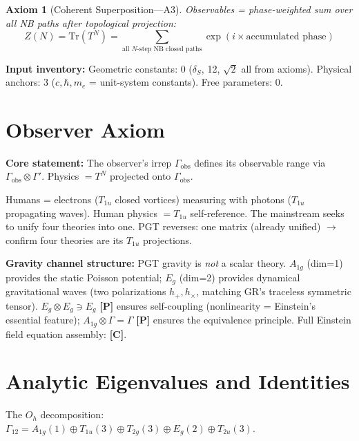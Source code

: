 \documentclass[11pt,a4paper]{article}
\newtheorem{axiom}{Axiom}
\newcommand{\gradeP}{\textbf{[P]}}
\newcommand{\gradeC}{\textbf{[C]}}
\begin{document}
\begin{axiom}[Coherent Superposition---A3]
Observables = phase-weighted sum over all NB paths after topological projection:
$$Z(N) = \mathrm{Tr}(T^N) = \sum_{\text{all $N$-step NB closed paths}} \exp(i\times\text{accumulated phase})$$
\end{axiom}

\textbf{Input inventory:} Geometric constants: 0 ($\delta_S$, 12, $\sqrt{2}$ all from axioms). Physical anchors: 3 ($c, \hbar, m_e$ = unit-system constants). Free parameters: 0.

\section{Observer Axiom}\label{sec:observer}

\textbf{Core statement:} The observer's irrep $\Gamma_{\mathrm{obs}}$ defines its observable range via $\Gamma_{\mathrm{obs}}\otimes\Gamma'$. Physics $= T^N$ projected onto $\Gamma_{\mathrm{obs}}$.

Humans = electrons ($T_{1u}$ closed vortices) measuring with photons ($T_{1u}$ propagating waves). Human physics $= T_{1u}$ self-reference. The mainstream seeks to unify four theories into one. PGT reverses: one matrix (already unified) $\to$ confirm four theories are its $T_{1u}$ projections.

\textbf{Gravity channel structure:} PGT gravity is \emph{not} a scalar theory. $A_{1g}$ (dim=1) provides the static Poisson potential; $E_g$ (dim=2) provides dynamical gravitational waves (two polarizations $h_+, h_\times$, matching GR's traceless symmetric tensor). $E_g\otimes E_g \ni E_g$ \gradeP{} ensures self-coupling (nonlinearity = Einstein's essential feature); $A_{1g}\otimes\Gamma = \Gamma$ \gradeP{} ensures the equivalence principle. Full Einstein field equation assembly: \gradeC.

\section{Analytic Eigenvalues and Identities}\label{sec:eigenvalues}

The $O_h$ decomposition: $\Gamma_{12} = A_{1g}(1) \oplus T_{1u}(3) \oplus T_{2g}(3) \oplus E_g(2) \oplus T_{2u}(3)$.
\end{document}

